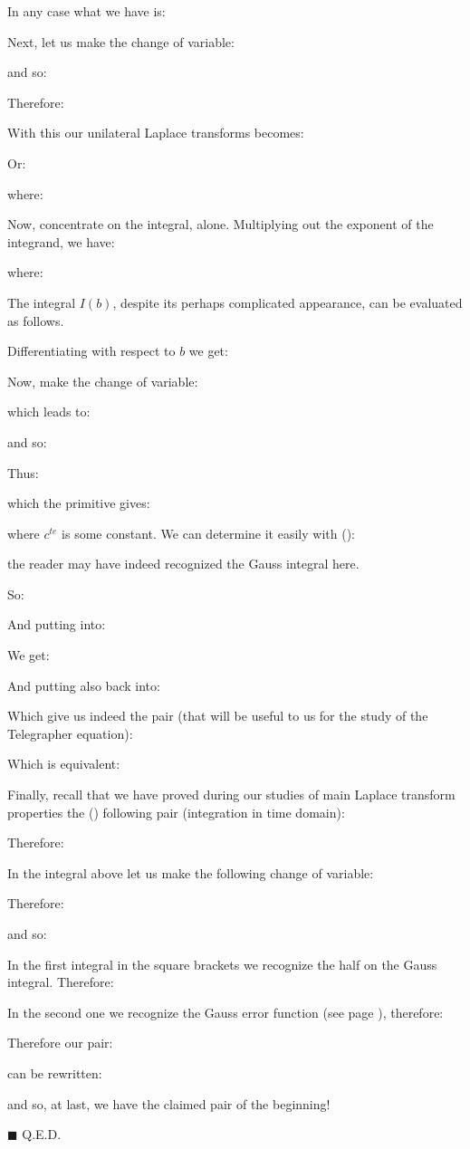 \begin{enumerate}
\begin{dem}
		In any case what we have is:
		
		Next, let us make the change of variable:
		
		and so:
		
		Therefore:
		
		With this our unilateral Laplace transforms becomes:
		
		Or:
		
		where:
		
		Now, concentrate on the integral, alone. Multiplying out the exponent
	of the integrand, we have:
		
		where:
		
		The integral $I(b)$, despite its perhaps complicated appearance, can be evaluated as follows.
		
		Differentiating  with respect to $b$ we get:
		
		Now, make the change of variable:
		
		which leads to:
		
		and so:
		
		Thus:
		
		which the primitive gives:
		
		where $c^{te}$ is some constant. We can determine it easily with ():
		
		the reader may have indeed recognized the Gauss integral here.
		
		So:
		
		And putting into:
		
		We get:
		
		And putting also back into:
		
		Which give us indeed the pair\label{laplace pair for telegrapher equation} (that will be useful to us for the study of the Telegrapher equation):
		
		Which is equivalent:
		
		Finally, recall that we have proved during our studies of main Laplace transform properties the () following pair (integration in time domain):
		
		Therefore:
		
		In the integral above let us make the following change of variable:
		
		Therefore:
		
		and so:
		
		In the first integral in the square brackets we recognize the half on the Gauss integral. Therefore:
		
		In the second one we recognize the Gauss error function (see page \pageref{error function}), therefore:
		
		Therefore our pair:
		
		can be rewritten:
		
		and so, at last, we have the claimed pair of the beginning!
		\begin{flushright}
			$\blacksquare$  Q.E.D.
		\end{flushright}
		\end{dem}
	\end{enumerate}
	
